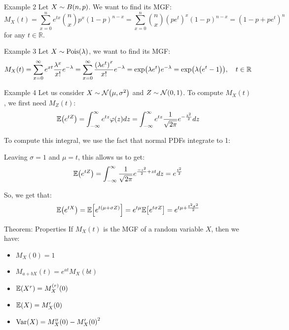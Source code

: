 \documentclass[a4paper]{article}
\begin{document}
\begin{parag}{Example 2}
    Let $X \followsdistr B\left(n, p\right)$. We want to find its MGF: 
    \[M_X\left(t\right) = \sum_{x=0}^{n} e^{tx} \binom{n}{x}p^x \left(1-p\right)^{n-x} = \sum_{x=0}^{n} \binom{n}{x} \left(p e^t\right)^x \left(1 - p\right)^{n-x} = \left(1 - p + pe^t\right)^n\]
    for any $t \in \mathbb{R}$.
\end{parag}

\begin{parag}{Example 3}
    Let $X \followsdistr \text{Pois}\left(\lambda\right)$, we want to find its MGF: 
    \[M_X\left(t\right) = \sum_{x=0}^{\infty} e^{xt} \frac{\lambda^x}{x!} e^{-\lambda} = \sum_{x=0}^{\infty} \frac{\left(\lambda e^t\right)^x}{x!}e^{-\lambda} = \exp\left(\lambda e^t\right) e^{-\lambda} = \exp\left(\lambda \left(e^t - 1\right)\right), \mathspace t \in \mathbb{R}\]
\end{parag}

\begin{parag}{Example 4}
    Let us consider $X \followsdistr \mathcal{N}\left(\mu, \sigma^2\right)$ and $Z \followsdistr \mathcal{N}\left(0, 1\right)$. To compute $M_X\left(t\right)$, we first need $M_Z\left(t\right)$: 
    \[\exval\left(e^{tZ}\right) = \int_{-\infty}^{\infty} e^{tz} \phi\left(z\right)dz = \int_{-\infty}^{\infty} e^{tz} \frac{1}{\sqrt{2\pi}} e^{-\frac{z^2}{2}} dz\]
    
    To compute this integral, we use the fact that normal PDFs integrate to 1: 

    Leaving $\sigma = 1$ and $\mu = t$, this allows us to get: 
    \[\exval\left(e^{tZ}\right) = \int_{-\infty}^{\infty} \frac{1}{\sqrt{2\pi}} e^{\frac{-z^2}{2} + zt} dz = e^{\frac{t^2}{2}}\]
    
    So, we get that: 
    \[\exval\left(e^{tX}\right) = \exval\left[e^{t\left(\mu + \sigma Z\right)}\right] = e^{t \mu} \exval\left[e^{t\sigma Z}\right] = e^{t \mu + \frac{t^2 \sigma ^2}{2}}\]
\end{parag}

\begin{parag}{Theorem: Properties}
    If $M_X\left(t\right)$ is the MGF of a random variable $X$, then we have:
    \begin{itemize}
        \item $M_X\left(0\right) = 1$
        \item $M_{a + bX}\left(t\right) = e^{at} M_X\left(bt\right)$
        \item $\exval\left(X^r\right) = M_X^{\left(r\right)}\left(0\right)$
        \item $\exval\left(X\right) = M'_X\left(0\right)$
        \item $\Var\left(X\right) = M''_X\left(0\right) - M'_X\left(0\right)^2$
    \end{itemize}
\end{parag}
\end{document}
